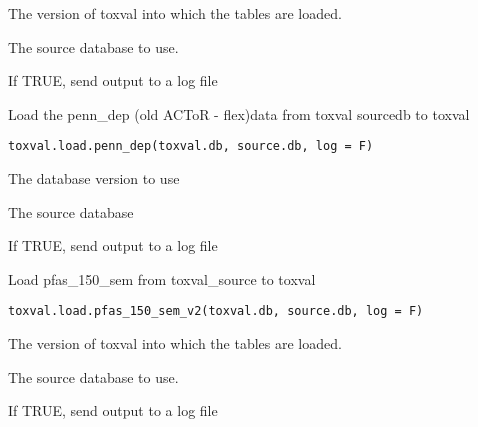 \documentclass[letterpaper]{book}
\begin{document}
%
\begin{Arguments}
\begin{ldescription}
\item[\code{toxval.db}] The version of toxval into which the tables are loaded.

\item[\code{source.db}] The source database to use.

\item[\code{log}] If TRUE, send output to a log file
\end{ldescription}
\end{Arguments}
%
\begin{Description}\relax
Load the penn\_dep (old ACToR - flex)data  from toxval sourcedb to toxval
\end{Description}
%
\begin{Usage}
\begin{verbatim}
toxval.load.penn_dep(toxval.db, source.db, log = F)
\end{verbatim}
\end{Usage}
%
\begin{Arguments}
\begin{ldescription}
\item[\code{toxval.db}] The database version to use

\item[\code{source.db}] The source database

\item[\code{log}] If TRUE, send output to a log file
\end{ldescription}
\end{Arguments}
%
\begin{Description}\relax
Load pfas\_150\_sem from toxval\_source to toxval
\end{Description}
%
\begin{Usage}
\begin{verbatim}
toxval.load.pfas_150_sem_v2(toxval.db, source.db, log = F)
\end{verbatim}
\end{Usage}
%
\begin{Arguments}
\begin{ldescription}
\item[\code{toxval.db}] The version of toxval into which the tables are loaded.

\item[\code{source.db}] The source database to use.

\item[\code{log}] If TRUE, send output to a log file
\end{ldescription}
\end{Arguments}
\end{document}

